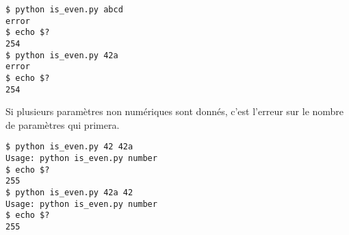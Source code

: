 \bigskip

\lstset{language=sh}
\begin{lstlisting}[frame=single,title={Cas d'erreur 2}]
$ python is_even.py abcd
error
$ echo $?
254
$ python is_even.py 42a
error
$ echo $?
254
\end{lstlisting}

\bigskip

\noindent Si plusieurs paramètres non numériques sont donnés, c'est l'erreur sur le nombre de paramètres qui primera.

\bigskip

\lstset{language=sh}
\begin{lstlisting}[frame=single,title={Cas d'erreur 2}]
$ python is_even.py 42 42a
Usage: python is_even.py number
$ echo $?
255
$ python is_even.py 42a 42
Usage: python is_even.py number
$ echo $?
255
\end{lstlisting}
